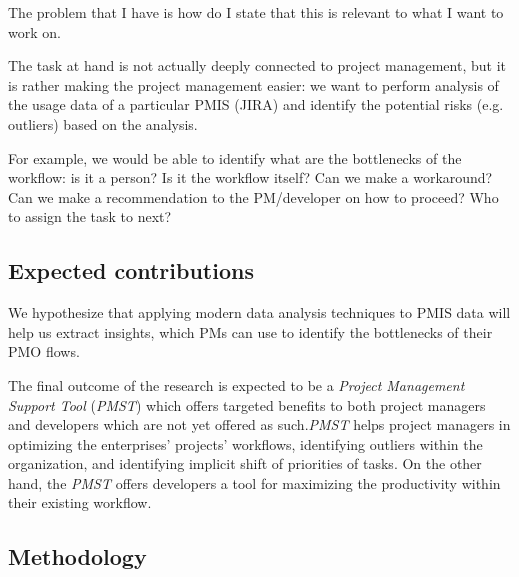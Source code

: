 \documentclass[a4paper, 12pt]{article}
\begin{document}
The problem that I have is how do I state that this is relevant to what I want to work on.

The task at hand is not actually deeply connected to project management, but it is rather making the project management easier:
we want to perform analysis of the usage data of a particular PMIS (JIRA) and identify the potential risks (e.g. outliers) based on the analysis.

For example, we would be able to identify what are the bottlenecks of the workflow: is it a person? Is it the workflow itself?
Can we make a workaround? Can we make a recommendation to the PM/developer on how to proceed? Who to assign the task to next?



\subsection{Expected contributions}


We hypothesize that applying modern data analysis techniques to PMIS data will help us extract insights, which PMs can use to identify the bottlenecks of their PMO flows.

The final outcome of the research is expected to be a \textit{Project Management Support Tool} (\textit{PMST}) which offers targeted benefits to both project managers and developers which are not yet offered as such.\textit{PMST} helps project managers in optimizing the enterprises' projects' workflows, identifying outliers within the organization, and identifying implicit shift of priorities of tasks. On the other hand, the \textit{PMST} offers developers a tool for maximizing the productivity within their existing workflow.

\subsection{Methodology}

\end{document}
